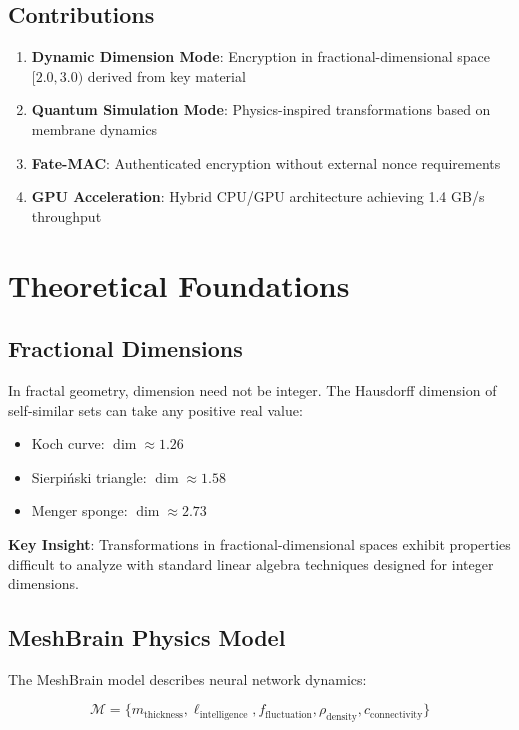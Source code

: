 \documentclass[11pt,a4paper]{article}
\begin{document}
\subsection{Contributions}

\begin{enumerate}
    \item \textbf{Dynamic Dimension Mode}: Encryption in fractional-dimensional space $[2.0, 3.0)$ derived from key material
    \item \textbf{Quantum Simulation Mode}: Physics-inspired transformations based on membrane dynamics
    \item \textbf{Fate-MAC}: Authenticated encryption without external nonce requirements
    \item \textbf{GPU Acceleration}: Hybrid CPU/GPU architecture achieving 1.4 GB/s throughput
\end{enumerate}

\section{Theoretical Foundations}

\subsection{Fractional Dimensions}

In fractal geometry, dimension need not be integer. The Hausdorff dimension of self-similar sets can take any positive real value:

\begin{itemize}
    \item Koch curve: $\dim \approx 1.26$
    \item Sierpi\'nski triangle: $\dim \approx 1.58$
    \item Menger sponge: $\dim \approx 2.73$
\end{itemize}

\textbf{Key Insight}: Transformations in fractional-dimensional spaces exhibit properties difficult to analyze with standard linear algebra techniques designed for integer dimensions.

\subsection{MeshBrain Physics Model}

The MeshBrain model describes neural network dynamics:

\begin{equation}
\mathcal{M} = \{m_{\text{thickness}}, \ell_{\text{intelligence}}, f_{\text{fluctuation}}, \rho_{\text{density}}, c_{\text{connectivity}}\}
\end{equation}
\end{document}
